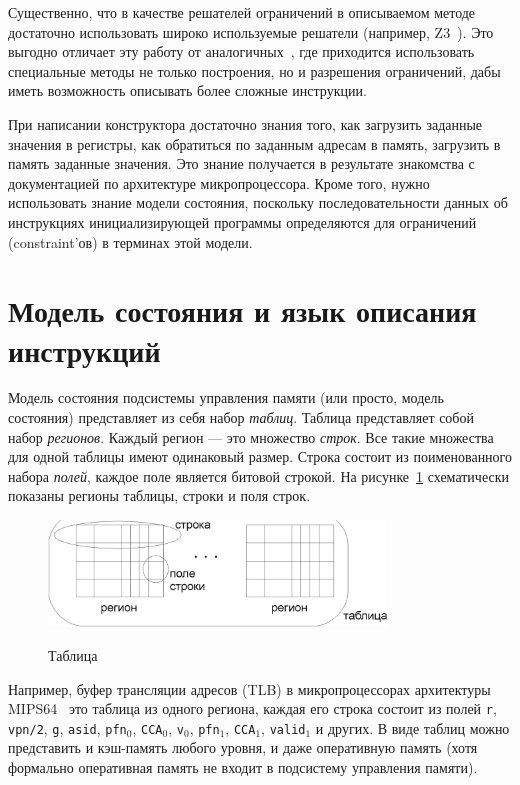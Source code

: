\documentclass[14pt]{extreport}
\begin{document}
Существенно, что в качестве решателей ограничений в описываемом методе
достаточно использовать широко используемые решатели (например, Z3~\cite{Z3}).
Это выгодно отличает эту работу от аналогичных~\cite{GenesysPro}, где приходится
использовать специальные методы не только построения, но и разрешения
ограничений, дабы иметь возможность описывать более сложные инструкции.

При написании конструктора достаточно знания того, как загрузить заданные
значения в регистры, как обратиться по заданным адресам в память, загрузить в
память заданные значения. Это знание получается в результате знакомства с
документацией по архитектуре микропроцессора. Кроме того, нужно использовать
знание модели состояния, поскольку последовательности данных об инструкциях
инициализирующей программы определяются для ограничений (constraint'ов) в
терминах этой модели.

\section{Модель состояния и язык описания инструкций}\label{state_model_section}

Модель состояния подсистемы управления памяти (или просто, модель состояния)
представляет из себя набор \emph{таблиц}. Таблица представляет собой набор
\emph{регионов}. Каждый регион --- это множество \emph{строк}. Все такие
множества для одной таблицы имеют одинаковый размер. Строка состоит из
поименованного набора \emph{полей}, каждое поле является битовой строкой. На
рисунке~\ref{table_picture} схематически показаны регионы таблицы, строки и поля
строк.

\begin{figure}[h] \center
  \includegraphics[width=0.8\textwidth]{2.theor/table.eps}\\
  \caption{Таблица}\label{table_picture}
\end{figure}

Например, буфер трансляции адресов (TLB) в микропроцессорах архитектуры
MIPS64~\cite{mips64_III} это таблица из одного региона, каждая его строка
состоит из полей \texttt{r}, \texttt{vpn/2}, \texttt{g}, \texttt{asid},
\texttt{pfn}$_0$, \texttt{CCA}$_0$, \texttt{v}$_0$, \texttt{pfn}$_1$,
\texttt{CCA}$_1$, \texttt{valid}$_1$ и других. В виде таблиц можно представить и
кэш-память любого уровня, и даже оперативную память (хотя формально оперативная
память не входит в подсистему управления памяти).
\end{document}
